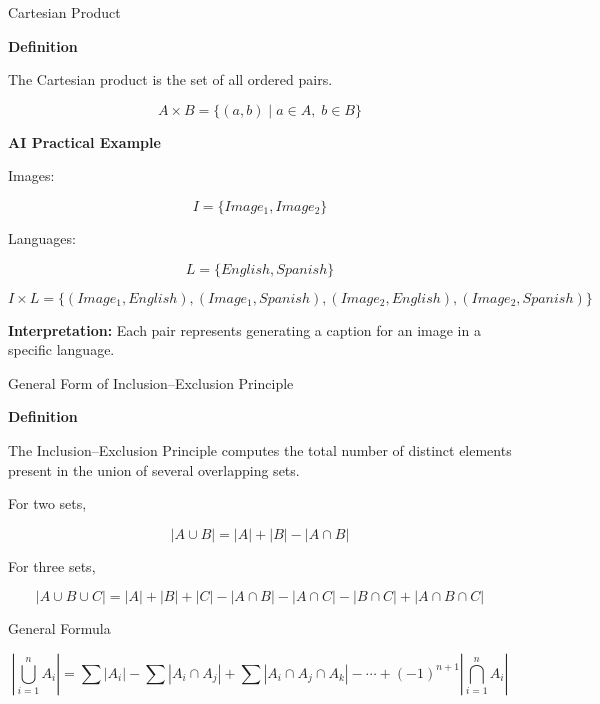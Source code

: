 \documentclass[aspectratio=169]{beamer}
\begin{document}
\begin{frame}{Cartesian Product}

\textbf{Definition}

The Cartesian product is the set of all ordered pairs.

\[
A\times B=\{(a,b)\mid a\in A,\;b\in B\}
\]

\vspace{0.3cm}

\textbf{AI Practical Example}

Images:

\[
I=\{Image_1,Image_2\}
\]

Languages:

\[
L=\{English,Spanish\}
\]

\[
I\times L=
\{
(Image_1,English),
(Image_1,Spanish),
(Image_2,English),
(Image_2,Spanish)
\}
\]

\textbf{Interpretation:} Each pair represents generating a caption for an image in a specific language.

\end{frame}
\begin{frame}{General Form of Inclusion--Exclusion Principle}

\textbf{Definition}

The Inclusion--Exclusion Principle computes the total number of
distinct elements present in the union of several overlapping sets.

\vspace{0.3cm}

For two sets,

\[
|A\cup B|
=
|A|+|B|-|A\cap B|
\]

\vspace{0.3cm}

For three sets,

\[
|A\cup B\cup C|
=
|A|+|B|+|C|
-|A\cap B|
-|A\cap C|
-|B\cap C|
+|A\cap B\cap C|
\]

\vspace{0.3cm}

General Formula

\[
\left|
\bigcup_{i=1}^{n}A_i
\right|
=
\sum |A_i|
-
\sum |A_i\cap A_j|
+
\sum |A_i\cap A_j\cap A_k|
-\cdots
+(-1)^{n+1}
\left|
\bigcap_{i=1}^{n}A_i
\right|
\]

\vspace{0.3cm}


\end{frame}
\end{document}

